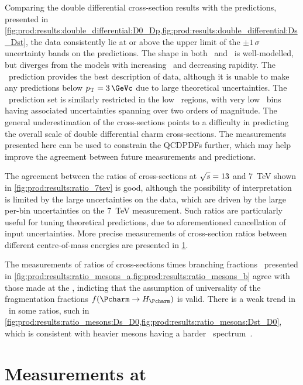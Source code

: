 Comparing the double differential cross-section results with the predictions,
presented in
\cref{fig:prod:results:double_differential:D0_Dp,fig:prod:results:double_differential:Ds_Dst},
the data consistently lie at or above the upper limit of the $\pm1\,\sigma$
uncertainty bands on the predictions.
The shape in both \pT\ and \rapidity\ is well-modelled, but diverges from the
models with increasing \pT\ and decreasing rapidity.
The \gmvfns\ prediction provides the best description of data, although it is
unable to make any predictions below $\pT = \SI{3}{\GeVc}$ due to large
theoretical uncertainties.
The \fonll\ prediction set is similarly restricted in the low \pT\ regions,
with very low \pT\ bins having associated uncertainties spanning over two
orders of magnitude.
The general underestimation of the cross-sections points to a difficulty in
predicting the overall scale of double differential charm cross-sections.
The measurements presented here can be used to constrain the \aclp{QCDPDF}
further, which may help improve the agreement between future measurements and
predictions.

The agreement between the ratios of cross-sections at $\sqrt{s} = 13$ and
\SI{7}{\TeV} shown in \cref{fig:prod:results:ratio_7tev} is good, although the
possibility of interpretation is limited by the large uncertainties on the
data, which are driven by the large per-bin uncertainties on the \SI{7}{\TeV}
measurement.
Such ratios are particularly useful for tuning theoretical predictions, due to
aforementioned cancellation of input uncertainties.
More precise measurements of cross-section ratios between different
centre-of-mass energies are presented in \cref{chap:prod:results:5tev}.

The measurements of ratios of cross-sections times branching fractions
\xsectimesbfrac\ presented in
\cref{fig:prod:results:ratio_mesons_a,fig:prod:results:ratio_mesons_b} agree
with those made at the \bfactories, indicting that the assumption of
universality of the fragmentation fractions $f(\cToHc)$ is valid.
There is a weak trend in \pT\ in some ratios, such in
\cref{fig:prod:results:ratio_mesons:Ds_D0,fig:prod:results:ratio_mesons:Dst_D0},
which is consistent with heavier mesons having a harder \pT\
spectrum~\cite{PDG2008}.

\section{Measurements at \texorpdfstring{}{sqrt(s) = 5 TeV}}
\label{chap:prod:results:5tev}

